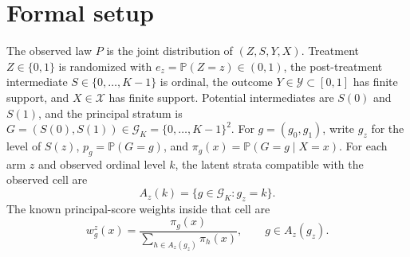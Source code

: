 \documentclass[11pt]{article}
\renewcommand{\Pr}{\mathbb{P}}
\theoremstyle{definition}
\theoremstyle{plain}
\theoremstyle{remark}
\begin{document}
\section{Formal setup}
The observed law \(P\) is the joint distribution of \((Z,S,Y,X)\).  Treatment \(Z\in\{0,1\}\) is randomized with \(e_z=\Pr(Z=z)\in(0,1)\), the post-treatment intermediate \(S\in\{0,\ldots,K-1\}\) is ordinal, the outcome \(Y\in\mathcal Y\subset[0,1]\) has finite support, and \(X\in\mathcal X\) has finite support.  Potential intermediates are \(S(0)\) and \(S(1)\), and the principal stratum is \(G=(S(0),S(1))\in\mathcal G_K=\{0,\ldots,K-1\}^2\).  For \(g=(g_0,g_1)\), write \(g_z\) for the level of \(S(z)\), \(p_g=\Pr(G=g)\), and \(\pi_g(x)=\Pr(G=g\mid X=x)\).  For each arm \(z\) and observed ordinal level \(k\), the latent strata compatible with the observed cell are
\[
  A_z(k)=\{g\in\mathcal G_K:g_z=k\}.
\]
The known principal-score weights inside that cell are
\[
  w^z_g(x)=\frac{\pi_g(x)}{\sum_{h\in A_z(g_z)}\pi_h(x)}, \qquad g\in A_z(g_z).
\]
\end{document}
